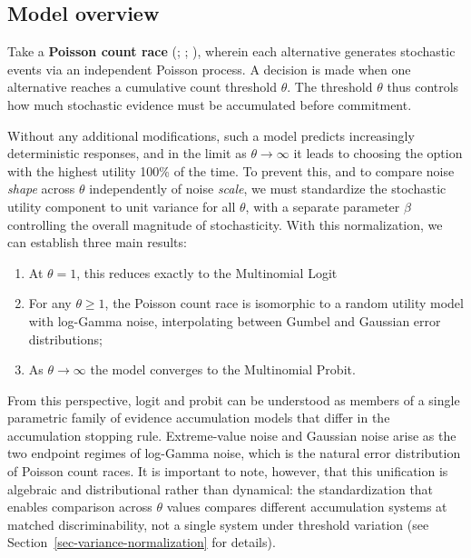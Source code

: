 \documentclass[
  man,
  floatsintext,
  longtable,
  a4paper,
  nolmodern,
  notxfonts,
  notimes,
  colorlinks=true,linkcolor=blue,citecolor=blue,urlcolor=blue]{apa7}
\providecommand{\tightlist}{%
  \setlength{\itemsep}{0pt}\setlength{\parskip}{0pt}}
\begin{document}
\subsection{Model overview}\label{model-overview}

Take a \textbf{Poisson count race}
(;
; ), wherein each alternative generates stochastic events
via an independent Poisson process. A decision is made when one
alternative reaches a cumulative count threshold \(\theta\). The
threshold \(\theta\) thus controls how much stochastic evidence must be
accumulated before commitment.

Without any additional modifications, such a model predicts increasingly
deterministic responses, and in the limit as \(\theta \to \infty\) it
leads to choosing the option with the highest utility 100\% of the time.
To prevent this, and to compare noise \emph{shape} across \(\theta\)
independently of noise \emph{scale}, we must standardize the stochastic
utility component to unit variance for all \(\theta\), with a separate
parameter \(\beta\) controlling the overall magnitude of stochasticity.
With this normalization, we can establish three main results:

\begin{enumerate}
\def\labelenumi{\arabic{enumi}.}
\tightlist
\item
  At \(\theta = 1\), this reduces exactly to the Multinomial Logit
\item
  For any \(\theta \ge 1\), the Poisson count race is isomorphic to a
  random utility model with log-Gamma noise, interpolating between
  Gumbel and Gaussian error distributions;
\item
  As \(\theta \to \infty\) the model converges to the Multinomial
  Probit.
\end{enumerate}

From this perspective, logit and probit can be understood as members of
a single parametric family of evidence accumulation models that differ
in the accumulation stopping rule. Extreme-value noise and Gaussian
noise arise as the two endpoint regimes of log-Gamma noise, which is the
natural error distribution of Poisson count races. It is important to
note, however, that this unification is algebraic and distributional
rather than dynamical: the standardization that enables comparison
across \(\theta\) values compares different accumulation systems at
matched discriminability, not a single system under threshold variation
(see Section~\ref{sec-variance-normalization} for details).
\end{document}
